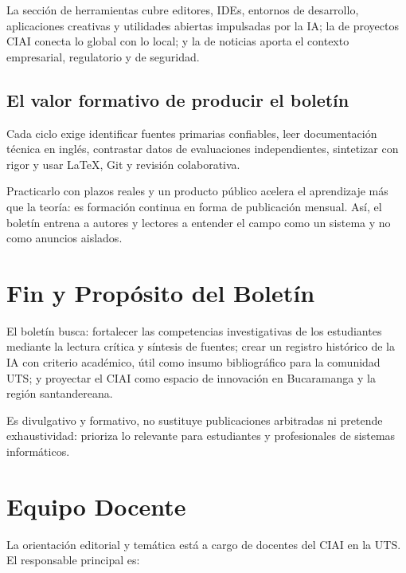\documentclass[conference,twocolumn,spanish]{IEEEtran}
\begin{document}
La sección de herramientas cubre editores, IDEs, entornos de desarrollo,
aplicaciones creativas y utilidades abiertas impulsadas por la IA\@; la
de proyectos CIAI conecta lo global con lo local; y la de noticias
aporta el contexto empresarial, regulatorio y de seguridad.

\subsection{El valor formativo de producir el boletín}

Cada ciclo exige identificar fuentes primarias confiables, leer
documentación técnica en inglés, contrastar datos de evaluaciones
independientes, sintetizar con rigor y usar \LaTeX{}, Git y revisión
colaborativa.

Practicarlo con plazos reales y un producto público acelera el
aprendizaje más que la teoría: es formación continua en forma de
publicación mensual. Así, el boletín entrena a autores y lectores a
entender el campo como un sistema y no como anuncios aislados.

\section{Fin y Propósito del Boletín}

El boletín busca: fortalecer las competencias investigativas de los
estudiantes mediante la lectura crítica y síntesis de fuentes; crear un
registro histórico de la IA con criterio académico, útil como insumo
bibliográfico para la comunidad UTS\@; y proyectar el CIAI como espacio
de innovación en Bucaramanga y la región santandereana.

Es divulgativo y formativo, no sustituye publicaciones arbitradas ni
pretende exhaustividad: prioriza lo relevante para estudiantes y
profesionales de sistemas informáticos.

\section{Equipo Docente}

La orientación editorial y temática está a cargo de docentes del CIAI en
la UTS\@. El responsable principal es:
\end{document}
